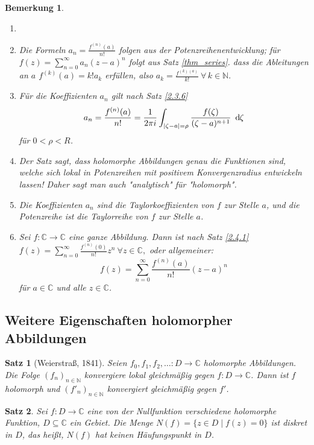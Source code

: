 \documentclass[a4paper,12pt]{article}
\theoremstyle{newthm}
\newtheorem{thm}{Satz}[subsection]
\theoremstyle{newdef}
\theoremstyle{newrem}
\newtheorem*{rem}{Bemerkung}
\newcommand{\N}{\mathbb{N}}
\newcommand{\C}{\mathbb{C}}
\renewcommand{\d}{\ \operatorname{d}\hspace{-2px}}
\begin{document}
		\begin{rem}
			\begin{enumerate}
				\item[]
				\item Die Formeln $ a_n = \frac{f^{(n)}(a)}{n!} $ folgen aus der Potenzreihenentwicklung; für $ f(z) = \sum_{n=0}^\infty a_n(z-a)^n $ folgt aus Satz \ref{thm_series}. dass die Ableitungen an $a$ $ f^{(k)}(a) = k!a_k $ erfüllen, also $ a_k = \frac{f^{(k)(a)}}{k!}\ \forall\, k \in \N. $
				\item Für die Koeffizienten $a_n$ gilt nach Satz \ref{2.3.6} 
				$$ a_n = \frac{f^{(n)}(a)}{n!} = \frac{1}{2 \pi i} \int_{|\zeta-a|=\rho} \frac{f(\zeta)}{(\zeta-a)^{n+1}} \d \zeta $$
				für $ 0 < \rho < R $.
				\item Der Satz sagt, dass holomorphe Abbildungen genau die Funktionen sind, welche sich lokal in Potenzreihen mit positivem Konvergenzradius entwickeln lassen! Daher sagt man auch "analytisch" für "holomorph".
				\item Die Koeffizienten $a_n$ sind die \emph{Taylorkoeffizienten von $f$ zur Stelle $a$}, und die Potenzreihe ist die \emph{Taylorreihe von $f$ zur Stelle $a$}.
				\item Sei $ f: \C \to \C $ eine ganze Abbildung. Dann ist nach Satz \ref{2.4.1} $ f(z) = \sum_{n=0}^\infty \frac{f^{(n)}(0)}{n!} z^n\ \forall z \in \C, $ oder allgemeiner:
				\[ f(z) = \sum_{n=0}^\infty \frac{f^{(n)}(a)}{n!} (z-a)^n \]
				für $a \in \C$ und alle $z \in \C$.
			\end{enumerate}
		\end{rem}
	
	\subsection[Weitere Eigenschaften]{Weitere Eigenschaften holomorpher Abbildungen}
		
		\begin{thm}[Weierstraß, 1841]\label{2.5.1}
			Seien $ f_0,f_1,f_2,\dots: D \to \C $ holomorphe Abbildungen. Die Folge $ (f_n)_{n \in  \N} $ konvergiere lokal gleichmäßig gegen $f: D \to \C$. Dann ist $f$ holomorph und $ (f'_n)_{n \in \N} $ konvergiert gleichmäßig gegen $f'$.
		\end{thm}
		
		\begin{thm}
			Sei $f: D \to \C$ eine von der Nullfunktion verschiedene holomorphe Funktion, $D \subseteq \C$ ein Gebiet. Die Menge $N(f) = \{z \in D \mid f(z) = 0\}$ ist diskret in $D$, das heißt, $N(f)$ hat keinen Häufungspunkt in $D$. 
		\end{thm}
		
\end{document}
